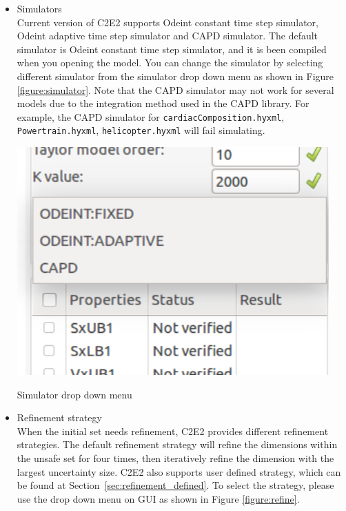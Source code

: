 \documentclass{tufte-book} %
\begin{document}
\begin{itemize}
\item {Simulators}\\
Current version of C2E2 supports Odeint constant time step simulator, Odeint adaptive time step simulator and CAPD simulator. The default simulator is Odeint constant time step simulator, and it is been compiled when you opening the model. You can change the simulator by selecting different simulator from the simulator drop down menu as shown in Figure \ref{figure:simulator}. Note that the CAPD simulator may not work for several models due to the integration method used in the CAPD library. For example, the CAPD simulator for  \texttt{cardiacComposition.hyxml}, \texttt{Powertrain.hyxml}, \texttt{helicopter.hyxml} will fail simulating. 

\begin{marginfigure}
\centerline{\includegraphics[scale=.24,keepaspectratio=true]{Images/simulator.png}}
 \caption{Simulator drop down menu} 
 \label{figure:simulator}
\end{marginfigure}

\item {Refinement strategy}\\
When the initial set needs refinement, C2E2 provides different refinement strategies. The default refinement strategy will refine the dimensions within the unsafe set for four times, then iteratively refine the dimension with the largest uncertainty size. C2E2 also supports user defined strategy, which can be found at Section~\ref{sec:refinement_defined}. To select the strategy, please use the drop down menu on GUI as shown in Figure \ref{figure:refine}.



\end{itemize}
\end{document}
